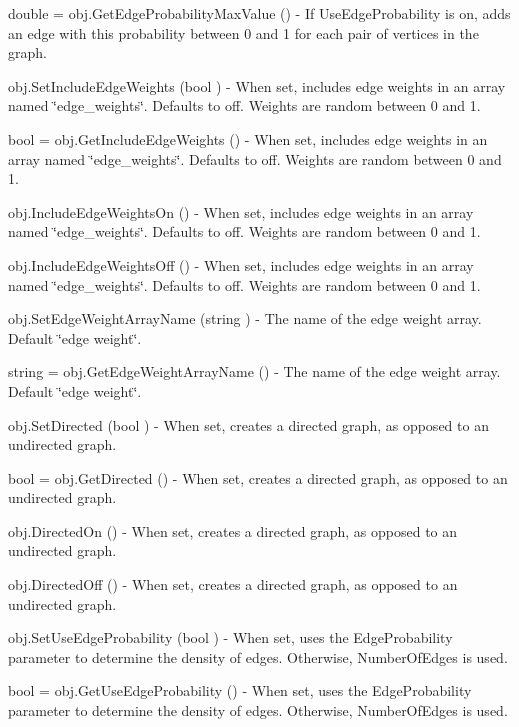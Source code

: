 \begin{DoxyItemize}
\item {\ttfamily double = obj.\-Get\-Edge\-Probability\-Max\-Value ()} -\/ If Use\-Edge\-Probability is on, adds an edge with this probability between 0 and 1 for each pair of vertices in the graph.  
\item {\ttfamily obj.\-Set\-Include\-Edge\-Weights (bool )} -\/ When set, includes edge weights in an array named \char`\"{}edge\-\_\-weights\char`\"{}. Defaults to off. Weights are random between 0 and 1.  
\item {\ttfamily bool = obj.\-Get\-Include\-Edge\-Weights ()} -\/ When set, includes edge weights in an array named \char`\"{}edge\-\_\-weights\char`\"{}. Defaults to off. Weights are random between 0 and 1.  
\item {\ttfamily obj.\-Include\-Edge\-Weights\-On ()} -\/ When set, includes edge weights in an array named \char`\"{}edge\-\_\-weights\char`\"{}. Defaults to off. Weights are random between 0 and 1.  
\item {\ttfamily obj.\-Include\-Edge\-Weights\-Off ()} -\/ When set, includes edge weights in an array named \char`\"{}edge\-\_\-weights\char`\"{}. Defaults to off. Weights are random between 0 and 1.  
\item {\ttfamily obj.\-Set\-Edge\-Weight\-Array\-Name (string )} -\/ The name of the edge weight array. Default \char`\"{}edge weight\char`\"{}.  
\item {\ttfamily string = obj.\-Get\-Edge\-Weight\-Array\-Name ()} -\/ The name of the edge weight array. Default \char`\"{}edge weight\char`\"{}.  
\item {\ttfamily obj.\-Set\-Directed (bool )} -\/ When set, creates a directed graph, as opposed to an undirected graph.  
\item {\ttfamily bool = obj.\-Get\-Directed ()} -\/ When set, creates a directed graph, as opposed to an undirected graph.  
\item {\ttfamily obj.\-Directed\-On ()} -\/ When set, creates a directed graph, as opposed to an undirected graph.  
\item {\ttfamily obj.\-Directed\-Off ()} -\/ When set, creates a directed graph, as opposed to an undirected graph.  
\item {\ttfamily obj.\-Set\-Use\-Edge\-Probability (bool )} -\/ When set, uses the Edge\-Probability parameter to determine the density of edges. Otherwise, Number\-Of\-Edges is used.  
\item {\ttfamily bool = obj.\-Get\-Use\-Edge\-Probability ()} -\/ When set, uses the Edge\-Probability parameter to determine the density of edges. Otherwise, Number\-Of\-Edges is used.  

\end{DoxyItemize}
